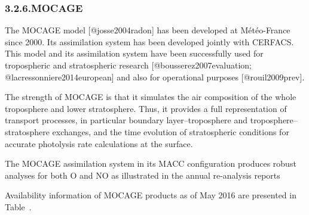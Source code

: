 \documentclass[9pt]{report}
\begin{document}
\subsubsection{3.2.6.\hspace*{0.5em}MOCAGE}\label{sec-mocage}%

\noindent{}The MOCAGE model [@josse2004radon] has been developed at Météo-France since 2000.
Its assimilation system has been developed jointly with CERFACS.
This model and its assimilation system have been successfully used for tropospheric and stratospheric research [@bousserez2007evaluation; @lacressonniere2014european] and also for operational purposes [@rouil2009prev].%

The strength of MOCAGE is that it simulates the air composition of the whole troposphere and lower stratosphere.
Thus, it provides a full representation of transport processes, in particular boundary layer–troposphere and troposphere–stratosphere exchanges, and the time evolution of stratospheric conditions for accurate photolysis rate calculations at the surface.%

The MOCAGE assimilation system in its MACC conﬁguration produces robust analyses for both O and NO as illustrated in the annual re-analysis reports %

Availability information of MOCAGE products as of May 2016 are presented in Table~.%
\end{document}
